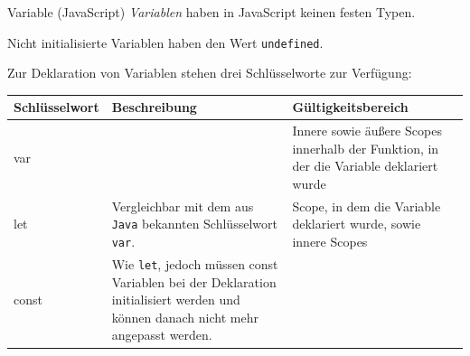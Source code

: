 \begin{defi}{Variable (JavaScript)}
    \emph{Variablen} haben in JavaScript keinen festen Typen.

    Nicht initialisierte Variablen haben den Wert \texttt{undefined}.

    Zur Deklaration von Variablen stehen drei Schlüsselworte zur Verfügung:

    \begin{tabularx}{\textwidth}{|l|X|X|}
        \hline
        Schlüsselwort & Beschreibung                                                                                                                            & Gültigkeitsbereich                                                                      \\\hline\hline
        var           &                                                                                                                                         & Innere sowie äußere Scopes innerhalb der Funktion, in der die Variable deklariert wurde \\\hline
        let           & Vergleichbar mit dem aus \texttt{Java} bekannten Schlüsselwort \texttt{var}.                                                            & Scope, in dem die Variable deklariert wurde, sowie innere Scopes                        \\\hline
        const         & Wie \texttt{let}, jedoch müssen const Variablen bei der Deklaration initialisiert werden und können danach nicht mehr angepasst werden. &                                                                                         \\\hline
    \end{tabularx}
\end{defi}

